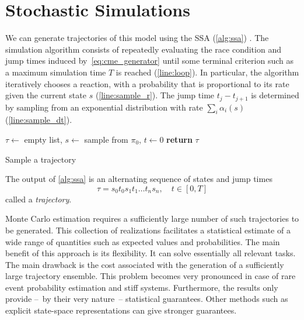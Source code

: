 \section{Stochastic Simulations}\label{sec:ssa}
We can generate trajectories of this model using the \acf{SSA}
(\autoref{alg:ssa})  \parencite{gillespie1977exact}.
The simulation algorithm consists of repeatedly evaluating the race
condition and jump times induced by~\eqref{eq:cme_generator} until
some terminal criterion such as a maximum simulation time $T$ is
reached (\autoref{line:loop}).
In particular, the algorithm iteratively chooses a reaction, with a
probability that is
proportional to its rate given the current state $s$ (\autoref{line:sample_r}).
The jump time $t_j- t_{j+1}$ is determined by sampling from an
exponential distribution with rate $\sum_i\alpha_i(s)$
(\autoref{line:sample_dt}).
\begin{algorithm}
  $\tau \leftarrow$ empty list, $s\leftarrow$ sample from $\pi_0$,
  $t\leftarrow 0$\;
  \textbf{return} $\tau$\;
  \caption{\label{alg:ssa}Sample a trajectory}
\end{algorithm}

The output of \autoref{alg:ssa} is an alternating sequence of states
and jump times
\[
  \tau = s_0t_0s_1t_1\dots t_n s_n, \quad t\in[0,T]
\]
called a \emph{trajectory}.

Monte Carlo estimation requires a sufficiently large number of such
trajectories to
be generated.
This collection of realizations facilitates a statistical estimate of
a wide range of quantities such as expected values and probabilities.
The main benefit of this approach is its flexibility.
It can solve essentially all relevant tasks.
The main drawback is the cost associated with the generation of a
sufficiently large trajectory ensemble.
This problem becomes very pronounced in case of rare event
probability estimation and stiff systems.
Furthermore, the results only provide --~by their very nature~--
statistical guarantees.
Other methods such as explicit state-space representations can give
stronger guarantees.

